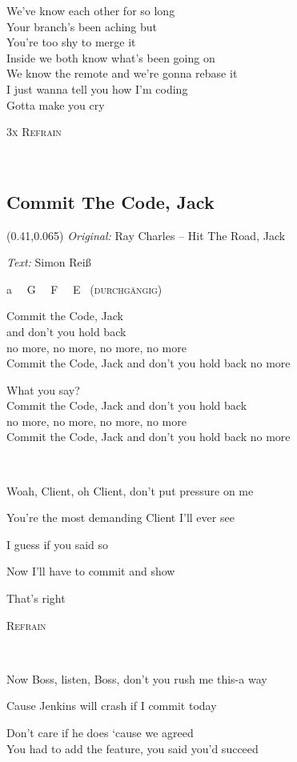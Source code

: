 \documentclass[11pt,a5paper]{article}
\newcommand\refrain[1]{\begin{tcolorbox}#1\end{tcolorbox} \ }
\newcommand{\refrefrain}{\refrain{\textsc{Refrain}} \ }
\newcommand{\refrefrainthreetimes}{\refrain{\textsc{3x Refrain}} \ }
\newcommand\songinfoshort[2]{\begin{textblock}{0.5}(0.41,0.065)
			\footnotesize 
			\hfill \textit{Original:} #1
			
			\hfill  \textit{Text:} #2
		\end{textblock}}
\begin{document}
	We've know each other for so long \\
	Your branch's been aching but \\
	You're too shy to merge it \\
	Inside we both know what's been going on \\
	We know the remote and we're gonna rebase it \\
	I just wanna tell you how I'm coding \\
	Gotta make you cry \\
	
	\refrefrainthreetimes
	
	\pagebreak
	
	\subsection{Commit The Code, Jack}
	\songinfoshort{Ray Charles -- Hit The Road, Jack}{Simon Reiß}
	
	a \ \ G \ \ F \ \ E \ \textsc{(durchgängig)}
	
	\refrain{
		Commit the Code, Jack \\
		and don’t you hold back \\
		no more, no more, no more, no more \\
		Commit the Code, Jack and don’t you hold back no more
		
		\hfill What you say? \\
		Commit the Code, Jack and don’t you hold back \\
		no more, no more, no more, no more \\
		Commit the Code, Jack and don’t you hold back no more}
	
	\hfill Woah, Client, oh Client, don’t put pressure on me
	
	\hfill You’re the most demanding Client I’ll ever see
	
	\hfill I guess if you said so
	
	\hfill Now I’ll have to commit and show 
	
	That’s right \\
	
	\refrefrain
	
	\hfill Now Boss, listen, Boss, don’t you rush me this-a way
	
	\hfill Cause Jenkins will crash if I commit today
	
	Don’t care if he does ‘cause we agreed \\
	You had to add the feature, you said you’d succeed \\
	
\end{document}
